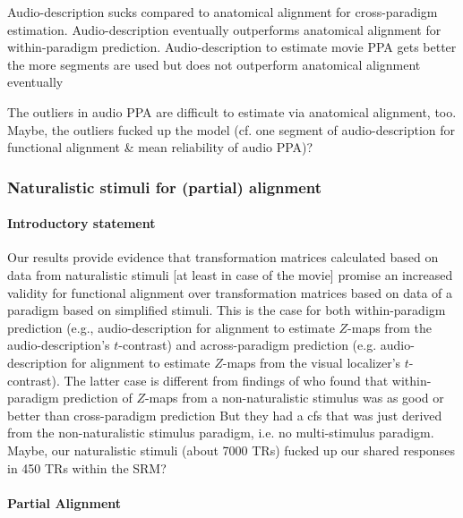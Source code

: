 %
Audio-description sucks compared to anatomical alignment for cross-paradigm
estimation.
%
Audio-description eventually outperforms anatomical alignment for
within-paradigm prediction.
%
Audio-description to estimate movie PPA gets better the more segments are used
but does not outperform anatomical alignment eventually



%
The outliers in audio PPA are difficult to estimate via anatomical alignment,
too.
%
Maybe, the outliers fucked up the model (cf. one segment of audio-description
for functional alignment \& mean reliability of audio PPA)?


\subsubsection{Naturalistic stimuli for (partial) alignment}



\paragraph{Introductory statement}
%
Our results provide evidence that transformation matrices calculated based on
data from naturalistic stimuli [at least in case of the movie] promise an
increased validity for functional alignment over transformation matrices based
on data of a paradigm based on simplified stimuli.
%
This is the case for both within-paradigm prediction (e.g., audio-description
for alignment to estimate $Z$-maps from the audio-description's $t$-contrast)
and across-paradigm prediction (e.g. audio-description for alignment to estimate
$Z$-maps from the visual localizer's $t$-contrast).
%
The latter case is different from findings of \citet{haxby2011common} who found
that within-paradigm prediction of $Z$-maps from a non-naturalistic stimulus was
as good or better than cross-paradigm prediction
%
But they had a \ac{cfs} that was just derived from the non-naturalistic stimulus
paradigm, i.e. no multi-stimulus paradigm.  Maybe, our naturalistic stimuli
(about 7000 TRs) fucked up our shared responses in 450 TRs within the SRM?





\paragraph{Partial Alignment}

